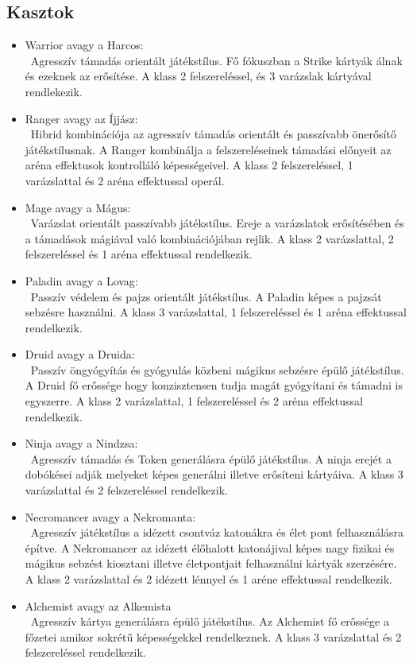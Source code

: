\subsection{Kasztok}
\begin{itemize}
        \item Warrior avagy a Harcos:\\\
        Agresszív támadás orientált játékstílus. Fő fókuszban a Strike kártyák álnak és ezeknek az erősítése. A klass 2 felszereléssel, és 3 varázslak kártyával rendlekezik. 
        \item Ranger avagy az Íjjász: \\\
        Hibrid kombinációja az agresszív támadás orientált és passzívabb önerősítő játékstílusnak. A Ranger kombinálja a felszereléseinek támadási előnyeit az aréna effektusok kontrolláló képességeivel. A klass 2 felszereléssel, 1 varázslattal és 2 aréna effektussal operál. 
        \item Mage  avagy a Mágus: \\\
        Varázslat orientált passzívabb játékstílus. Ereje a varázslatok erősítésében és a támadások mágiával való kombinációjában rejlik. A klass 2 varázslattal, 2 felszereléssel és 1 aréna effektussal rendelkezik.
        \item Paladin avagy a Lovag: \\\
        Passzív védelem és pajzs orientált játékstílus. A Paladin képes a pajzsát sebzésre használni.  A klass 3 varázslattal, 1 felszereléssel és 1 aréna effektussal rendelkezik.
        \item Druid avagy a Druida:\\\
        Passzív öngyógyítás és gyógyulás közbeni mágikus sebzésre épülő játékstílus. A Druid fő erőssége hogy konzisztensen tudja magát gyógyítani és támadni is egyszerre. A klass 2 varázslattal, 1 felszereléssel és 2 aréna effektussal rendelkezik.
        \clearpage
        \item Ninja  avagy a Nindzsa:\\\
        Agresszív támadás és Token generálásra épülő játékstílus. A ninja erejét a dobókései adják melyeket képes generálni illetve erősíteni kártyáiva. A klass 3 varázslattal és 2 felszereléssel rendelkezik.
        \item Necromancer avagy a Nekromanta:\\\
        Agresszív játékstílus a idézett csontváz katonákra és élet pont felhasználásra építve.
        A Nekromancer az idézett élőhalott katonájival képes nagy fizikai és mágikus sebzést kiosztani illetve életpontjait felhasználni kártyák szerzésére. A klass 2 varázslattal és 2 idézett lénnyel és 1 aréne effektussal rendelkezik.
        \item Alchemist avagy az Alkemista\\\
        Agresszív kártya generálásra épülő játékstílus. Az Alchemist fő erőssége a főzetei amikor sokrétű képességekkel rendelkeznek. A klass 3 varázslattal és 2 felszereléssel rendelkezik.
\end{itemize}

